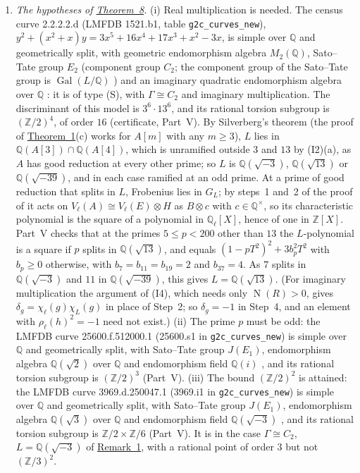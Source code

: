 \documentclass[11pt]{article}
\newcommand{\Q}{\mathbb Q}
\newcommand{\Z}{\mathbb Z}
\DeclareMathOperator{\Gal}{Gal}
\DeclareMathOperator{\Norm}{N}
\begin{document}
\begin{enumerate}
\item\label{rem-hyp} \emph{The hypotheses of \hyperref[thm-inertia]{Theorem~8}.} (i) Real multiplication is
needed. The census curve 2.2.2.2.d (LMFDB 1521.b1, table \texttt{g2c\_curves\_new}),
\(y^2+(x^2+x)y=3x^5+16x^4+17x^3+x^2-3x\), is simple over \(\Q\) and geometrically split, with geometric
endomorphism algebra \(M_2(\Q)\), Sato--Tate group \(E_2\) (component group \(C_2\); the component group of the Sato--Tate group is
\(\Gal(L/\Q)\) \cite{FKRS}) and an imaginary quadratic
endomorphism algebra over \(\Q\) \cite{LMFDB}: it is of type (S), with \(\Gamma\cong C_2\) and imaginary
multiplication. The discriminant of this model is \(3^6\cdot13^6\), and its rational torsion
subgroup is \((\Z/2)^4\), of order \(16\) (certificate, Part~V). By Silverberg's theorem \cite[Theorem~2.4]{Sb}
(the proof of \hyperref[thm-full3]{Theorem~1}(c) works for \(A[m]\) with any \(m\ge3\)), \(L\) lies in
\(\Q(A[3])\cap\Q(A[4])\), which is unramified outside \(3\) and \(13\) by (I2)(a), as \(A\) has good reduction at
every other prime; so \(L\) is \(\Q(\sqrt{-3})\), \(\Q(\sqrt{13})\) or \(\Q(\sqrt{-39})\), and in each case ramified
at an odd prime. At a prime of good reduction that splits in \(L\), Frobenius lies in \(G_L\); by steps~1 and~2 of
the proof of \cite[Lemma~3]{P2214} it acts on \(V_\ell(A)\cong V_\ell(E)\otimes H\) as \(B\otimes c\) with
\(c\in\Q^\times\), so its characteristic polynomial is the square of a polynomial in \(\Q_\ell[X]\), hence of one in
\(\Z[X]\). Part~V checks that at the primes \(5\le p<200\) other than \(13\) the \(L\)-polynomial is a square if
\(p\) splits in \(\Q(\sqrt{13})\), and equals \((1-pT^2)^2+3b_p^2T^2\) with \(b_p\ge0\) otherwise, with \(b_7=b_{11}=b_{19}=2\) and \(b_{37}=4\). As \(7\) splits in
\(\Q(\sqrt{-3})\) and \(11\) in \(\Q(\sqrt{-39})\), this gives \(L=\Q(\sqrt{13})\). (For imaginary multiplication
the argument of (I4), which needs only \(\Norm(R)>0\), gives \(\delta_g=\chi_\ell(g)\chi_L(g)\) in place of Step~2;
so \(\delta_g=-1\) in Step~4, and an element with \(\rho_\ell(h)^2=-1\) need not exist.) (ii) The prime \(p\) must be
odd: the LMFDB curve 25600.f.512000.1 (25600.s1 in \texttt{g2c\_curves\_new}) is simple over \(\Q\) and
geometrically split, with Sato--Tate group \(J(E_1)\), endomorphism algebra \(\Q(\sqrt2)\) over \(\Q\) and
endomorphism field \(\Q(i)\) \cite{LMFDB}, and its rational torsion subgroup is \((\Z/2)^3\) (Part~V). (iii) The
bound \((\Z/2)^2\) is attained: the LMFDB curve 3969.d.250047.1 (3969.i1 in \texttt{g2c\_curves\_new}) is simple
over \(\Q\) and geometrically split, with Sato--Tate group \(J(E_1)\), endomorphism algebra \(\Q(\sqrt3)\) over
\(\Q\) and endomorphism field \(\Q(\sqrt{-3})\) \cite{LMFDB}, and its rational torsion subgroup is
\(\Z/2\times\Z/6\) (Part~V). It is in the case \(\Gamma\cong C_2\), \(L=\Q(\sqrt{-3})\) of
\hyperref[rem-more]{Remark~1}, with a rational point of order \(3\) but not \((\Z/3)^2\).


\end{enumerate}
\end{document}
